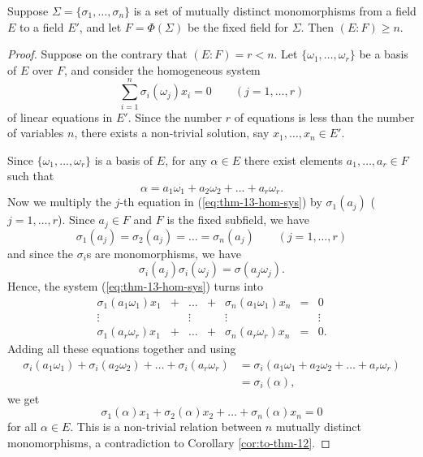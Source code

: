 \begin{theorem}\label{thm:13}
	Suppose $\Sigma = \{\sigma_1, \dots, \sigma_n\}$ is a set of mutually distinct monomorphisms from a field $E$ to a field $E'$, and let $F = \Phi(\Sigma)$ be the fixed field for $\Sigma$. Then $(E : F) \geq n$.
	\begin{proof}
		Suppose on the contrary that $(E : F) = r < n$. Let $\{\omega_1, \dots, \omega_r\}$ be a basis of $E$ over $F$, and consider the homogeneous system
		\begin{equation}\label{eq:thm-13-hom-sys}
			\sum_{i = 1}^n{\sigma_i(\omega_j)x_i} = 0 \qquad (j = 1, \dots, r)
		\end{equation}
		of linear equations in $E'$. Since the number $r$ of equations is less than the number of variables $n$, there exists a non-trivial solution, say $x_1, \dots, x_n \in E'$.
		
		Since $\{\omega_1, \dots, \omega_r\}$ is a basis of $E$, for any $\alpha \in E$ there exist elements $a_1, \dots, a_r \in F$ such that
		\[
			\alpha = a_1 \omega_1 + a_2 \omega_2 + \dots + a_r \omega_r.
		\]
		Now we multiply the $j$-th equation in (\ref{eq:thm-13-hom-sys}) by $\sigma_1(a_j)$ ($j = 1, \dots, r$). Since $a_j \in F$ and $F$ is the fixed subfield, we have
		\[
			\sigma_1(a_j) = \sigma_2(a_j) = \dots = \sigma_n(a_j) \qquad (j = 1, \dots, r)
		\]
		and since the $\sigma_i$s are monomorphisms, we have
		\[
			\sigma_i(a_j) \sigma_i(\omega_j) = \sigma(a_j \omega_j).
		\]
		Hence, the system (\ref{eq:thm-13-hom-sys}) turns into
		\[
			\begin{matrix}
				\sigma_1(a_1 \omega_1)x_1 & + & \dots & + & \sigma_n(a_1 \omega_1)x_n & = & 0 \\
				\vdots  &  & \vdots &  & \vdots &  & \vdots \\
				\sigma_1(a_r \omega_r)x_1 & + & \dots & + & \sigma_n(a_r \omega_r)x_n & = & 0.
			\end{matrix}
		\]
		Adding all these equations together and using
		\begin{align*}
			\sigma_i(a_1 \omega_1) + \sigma_i(a_2 \omega_2) + \dots + \sigma_i(a_r \omega_r) &= \sigma_i(a_1 \omega_1 + a_2 \omega_2 + \dots + a_r \omega_r) \\
				&= \sigma_i(\alpha),
		\end{align*}
		we get
		\[
			\sigma_1(\alpha)x_1 + \sigma_2(\alpha)x_2 + \dots + \sigma_n(\alpha)x_n = 0
		\]
		for all $\alpha \in E$. This is a non-trivial relation between $n$ mutually distinct monomorphisms, a contradiction to Corollary \ref{cor:to-thm-12}.
	\end{proof}
\end{theorem}

